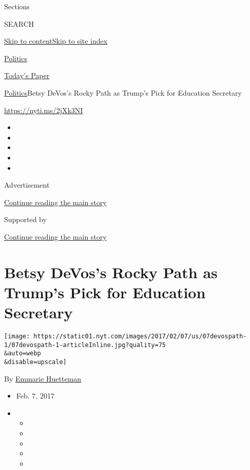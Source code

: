 Sections

SEARCH

\protect\hyperlink{site-content}{Skip to
content}\protect\hyperlink{site-index}{Skip to site index}

\href{https://www.nytimes.com/section/politics}{Politics}

\href{https://myaccount.nytimes.com/auth/login?response_type=cookie\&client_id=vi}{}

\href{https://www.nytimes.com/section/todayspaper}{Today's Paper}

\href{/section/politics}{Politics}\textbar{}Betsy DeVos's Rocky Path as
Trump's Pick for Education Secretary

\url{https://nyti.ms/2jXk3NI}

\begin{itemize}
\item
\item
\item
\item
\item
\end{itemize}

Advertisement

\protect\hyperlink{after-top}{Continue reading the main story}

Supported by

\protect\hyperlink{after-sponsor}{Continue reading the main story}

\hypertarget{betsy-devoss-rocky-path-as-trumps-pick-for-education-secretary}{%
\section{Betsy DeVos's Rocky Path as Trump's Pick for Education
Secretary}\label{betsy-devoss-rocky-path-as-trumps-pick-for-education-secretary}}

\texttt{[image: https://static01.nyt.com/images/2017/02/07/us/07devospath-1/07devospath-1-articleInline.jpg?quality=75\\\&auto=webp\\\&disable=upscale]}

By \href{https://www.nytimes.com/by/emmarie-huetteman}{Emmarie
Huetteman}

\begin{itemize}
\item
  Feb. 7, 2017
\item
  \begin{itemize}
  \item
  \item
  \item
  \item
  \item
  \end{itemize}
\end{itemize}

